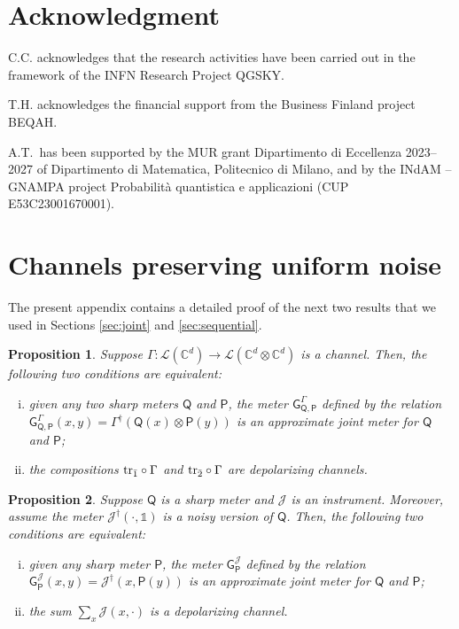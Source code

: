 \documentclass[12pt,reqno]{amsart}
\newtheorem{proposition}{Proposition}
\theoremstyle{definition}
\newcommand{\ptr}[2]{{\rm tr}_{#1} #2} %
\newcommand{\id}{\mathds{1}} %
\newcommand{\Qo}{\mathsf{Q}}%
\newcommand{\Po}{\mathsf{P}}%
\newcommand{\Go}{\mathsf{G}}%
\newcommand{\Cb}{\mathbb{C}} %
\newcommand{\lc}[1]{\mathcal{L}(\Cb^{#1})} %
\newcommand{\elle}[1]{\mathcal{L}(#1)} %
\newcommand{\ii}{\mathcal{J}}
\begin{document}
\section{Acknowledgment}

C.C. acknowledges that the research activities  have been carried out in the framework of the INFN Research Project QGSKY.

T.H. acknowledges the financial support from the Business Finland project BEQAH.

A.T.~has been supported by the MUR grant Dipartimento di Eccellenza 2023–2027 of Dipartimento di Matematica, Politecnico di Milano, and by the INdAM -- GNAMPA project Probabilit\`a quantistica e applicazioni (CUP E53C23001670001).

\newpage


\appendix

\section{Channels preserving uniform noise}\label{app:noise}

The present appendix contains a detailed proof of the next two results that we used in Sections \ref{sec:joint} and \ref{sec:sequential}.
\begin{proposition}\label{prop:app_noise_1}
Suppose $\Gamma:\lc{d}\to\elle{\Cb^d\otimes\Cb^d}$ is a channel. Then, the following two conditions are equivalent:
\begin{enumerate}[(i)]
\item given any two sharp meters $\Qo$ and $\Po$, the meter $\Go^\Gamma_{\Qo,\Po}$ defined by the relation $\Go^\Gamma_{\Qo,\Po}(x,y) = \Gamma^\dag(\Qo(x)\otimes\Po(y))$ is an approximate joint meter for $\Qo$ and $\Po$;\label{it:app_noise_1_1}
\item the compositions $\ptr{\bar{1}}\circ\Gamma$ and $\ptr{\bar{2}}\circ\Gamma$ are depolarizing channels.
\end{enumerate}
\end{proposition}
\begin{proposition}\label{prop:app_noise_2}
Suppose $\Qo$ is a sharp meter and $\ii$ is an instrument. Moreover, assume the meter $\ii^\dag(\cdot,\id)$ is a noisy version of $\Qo$. Then, the following two conditions are equivalent:
\begin{enumerate}[(i)]
\item given any sharp meter $\Po$, the meter $\Go^\ii_\Po$ defined by the relation $\Go^\ii_\Po(x,y) = \ii^\dag(x,\Po(y))$ is an approximate joint meter for $\Qo$ and $\Po$;\label{it:app_noise_2_1}
\item the sum $\sum_x\ii(x,\cdot)$ is a depolarizing channel.
\end{enumerate}
\end{proposition}
\end{document}
